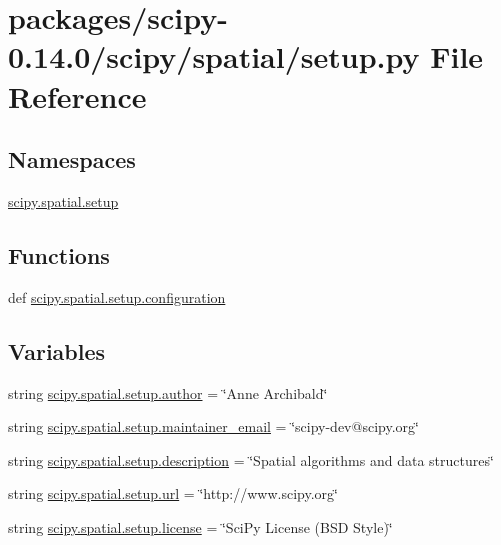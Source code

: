 \hypertarget{packages_2scipy-0_814_80_2scipy_2spatial_2setup_8py}{}\section{packages/scipy-\/0.14.0/scipy/spatial/setup.py File Reference}
\label{packages_2scipy-0_814_80_2scipy_2spatial_2setup_8py}
\subsection*{Namespaces}
\begin{DoxyCompactItemize}
\item 
 \hyperlink{namespacescipy_1_1spatial_1_1setup}{scipy.\+spatial.\+setup}
\end{DoxyCompactItemize}
\subsection*{Functions}
\begin{DoxyCompactItemize}
\item 
def \hyperlink{namespacescipy_1_1spatial_1_1setup_ae08ff0ef516914b07ead6105ec23e7a1}{scipy.\+spatial.\+setup.\+configuration}
\end{DoxyCompactItemize}
\subsection*{Variables}
\begin{DoxyCompactItemize}
\item 
string \hyperlink{namespacescipy_1_1spatial_1_1setup_a4e558852d84566a54d34605e52aa66dc}{scipy.\+spatial.\+setup.\+author} = \char`\"{}Anne Archibald\char`\"{}
\item 
string \hyperlink{namespacescipy_1_1spatial_1_1setup_a2c684b97849fa3e49146010b784715b2}{scipy.\+spatial.\+setup.\+maintainer\+\_\+email} = \char`\"{}scipy-\/dev@scipy.\+org\char`\"{}
\item 
string \hyperlink{namespacescipy_1_1spatial_1_1setup_ae2e4f77ec54a3635ae1d37cd435a756c}{scipy.\+spatial.\+setup.\+description} = \char`\"{}Spatial algorithms and data structures\char`\"{}
\item 
string \hyperlink{namespacescipy_1_1spatial_1_1setup_a28becf286a2bc39bca319028faf4a52b}{scipy.\+spatial.\+setup.\+url} = \char`\"{}http\+://www.\+scipy.\+org\char`\"{}
\item 
string \hyperlink{namespacescipy_1_1spatial_1_1setup_a0eb875f9571630c8c4e7ab48ab0a3213}{scipy.\+spatial.\+setup.\+license} = \char`\"{}Sci\+Py License (B\+S\+D Style)\char`\"{}
\end{DoxyCompactItemize}
